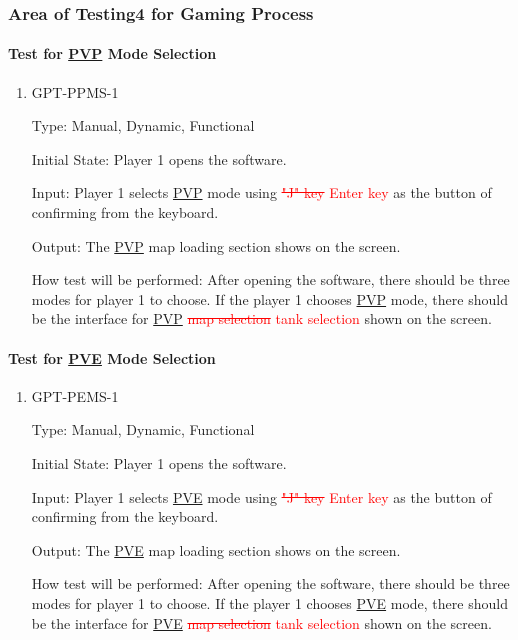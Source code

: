 \documentclass[12pt, titlepage]{article}
\begin{document}
\subsubsection{Area of Testing4 for Gaming Process}

\paragraph{Test for \underline{PVP} Mode Selection}

\begin{enumerate}

\item{GPT-PPMS-1\\}

Type: Manual, Dynamic, Functional
					
Initial State: Player 1 opens the software.
					
Input: Player 1 selects \underline{PVP} mode using \textcolor{red}{\sout{"J" key}} \textcolor{red}{Enter key} as the button of confirming from the keyboard.
					
Output: The \underline{PVP} map loading section shows on the screen.
					
How test will be performed: After opening the software, there should be three modes for player 1 to choose. If the player 1 chooses \underline{PVP} mode, there should be the interface for \underline{PVP} \textcolor{red}{\sout{map selection}} \textcolor{red}{tank selection} shown on the screen. 

\end{enumerate}

\paragraph{Test for \underline{PVE} Mode Selection}

\begin{enumerate}

\item{GPT-PEMS-1\\}

Type: Manual, Dynamic, Functional
					
Initial State: Player 1 opens the software.
					
Input: Player 1 selects \underline{PVE} mode using \textcolor{red}{\sout{"J" key}} \textcolor{red}{Enter key} as the button of confirming from the keyboard.
					
Output: The \underline{PVE} map loading section shows on the screen.
					
How test will be performed: After opening the software, there should be three modes for player 1 to choose. If the player 1 chooses \underline{PVE} mode, there should be the interface for \underline{PVE} \textcolor{red}{\sout{map selection}} \textcolor{red}{tank selection} shown on the screen. 

\end{enumerate}
\end{document}
